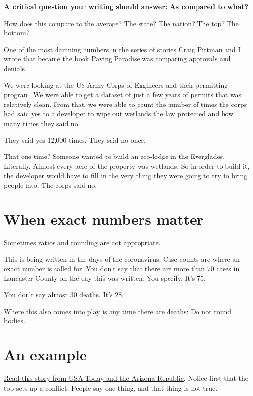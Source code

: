 \documentclass[
  letterpaper,
  DIV=11,
  numbers=noendperiod]{scrreprt}
\begin{document}
\textbf{A critical question your writing should answer: As compared to
what?}

How does this compare to the average? The state? The nation? The top?
The bottom?

One of the most damning numbers in the series of stories Craig Pittman
and I wrote that became the book
\href{https://www.amazon.com/Paving-Paradise-Floridas-Vanishing-Wetlands-ebook/dp/B004HZXZCE}{Paving
Paradise} was comparing approvals and denials.

We were looking at the US Army Corps of Engineers and their permitting
program. We were able to get a dataset of just a few years of permits
that was relatively clean. From that, we were able to count the number
of times the corps had said yes to a developer to wipe out wetlands the
law protected and how many times they said no.

They said yes 12,000 times. They said no once.

That one time? Someone wanted to build an eco-lodge in the Everglades.
Literally. Almost every acre of the property was wetlands. So in order
to build it, the developer would have to fill in the very thing they
were going to try to bring people into. The corps said no.

\hypertarget{when-exact-numbers-matter}{%
\section{When exact numbers matter}\label{when-exact-numbers-matter}}

Sometimes ratios and rounding are not appropriate.

This is being written in the days of the coronavirus. Case counts are
where an exact number is called for. You don't say that there are more
than 70 cases in Lancaster County on the day this was written. You
specify. It's 75.

You don't say almost 30 deaths. It's 28.

Where this also comes into play is any time there are deaths: Do not
round bodies.

\hypertarget{an-example}{%
\section{An example}\label{an-example}}

\href{https://www.azcentral.com/in-depth/news/local/arizona-wildfires/2019/07/22/wildfire-risks-more-than-500-spots-have-greater-hazard-than-paradise/1434502001/}{Read
this story from USA Today and the Arizona Republic}. Notice first that
the top sets up a conflict: People say one thing, and that thing is not
true.
\end{document}
